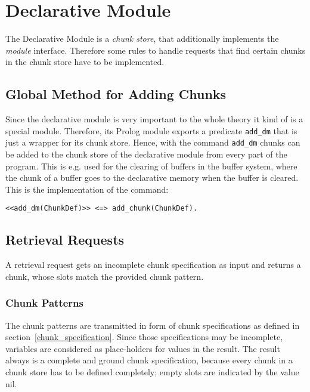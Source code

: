 \section{Declarative Module}

The Declarative Module is a \emph{chunk store}, that additionally implements the \emph{module} interface. Therefore some rules to handle requests that find certain chunks in the chunk store have to be implemented. 

\subsection{Global Method for Adding Chunks}
\label{global_method_for_adding_chunks}

Since the declarative module is very important to the whole theory it kind of is a special module. Therefore, its Prolog module exports a predicate \verb|add_dm| that is just a wrapper for its chunk store. Hence, with the command \verb|add_dm| chunks can be added to the chunk store of the declarative module from every part of the program. This is e.g. used for the clearing of buffers in the buffer system, where the chunk of a buffer goes to the declarative memory when the buffer is cleared. This is the implementation of the command:

\begin{lstlisting}
<<add_dm(ChunkDef)>> <=> add_chunk(ChunkDef).
\end{lstlisting}



\subsection{Retrieval Requests}
\label{retrieval_requests}

A retrieval request gets an incomplete chunk specification as input and returns a chunk, whose slots match the provided chunk pattern.

\subsubsection{Chunk Patterns}

The chunk patterns are transmitted in form of chunk specifications as defined in section~\ref{chunk_specification}. Since those specifications may be incomplete, variables are considered as place-holders for values in the result. The result always is a complete and ground chunk specification, because every chunk in a chunk store has to be defined completely; empty slots are indicated by the value nil.

